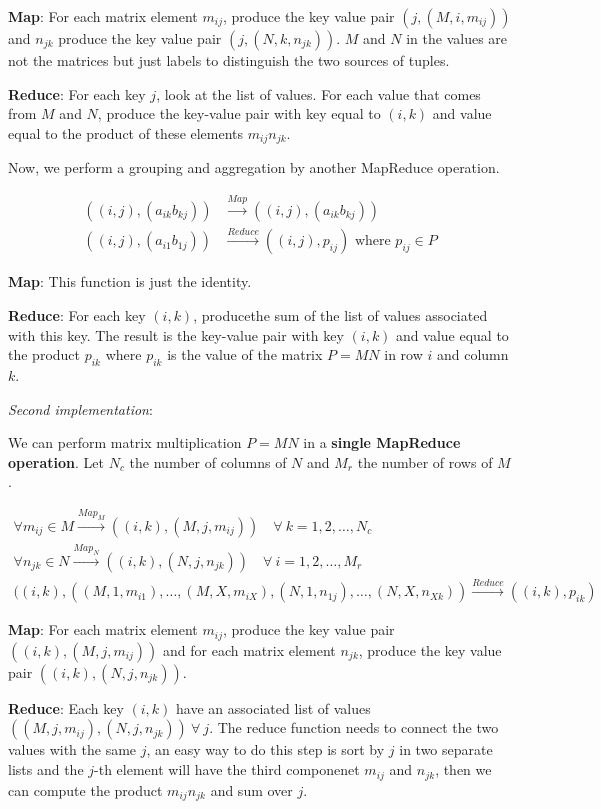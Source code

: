 \textbf{Map}: For each matrix element $m_{ij}$, produce the key value pair $(j, (M, i, m_{ij}))$ and $n_{jk}$ produce the key value pair $(j, (N, k, n_{jk}))$. $M$ and $N$ in the values are not the matrices but just labels to distinguish the two sources of tuples. 

\textbf{Reduce}: For each key $j$, look at the list of values. For each value that comes from $M$ and $N$, produce the key-value pair with key equal to $(i, k)$ and value equal to the product of these elements $m_{ij}n_{jk}$. 

Now, we perform a grouping and aggregation by another MapReduce operation.

\begin{equation*}
    \begin{split}
        ((i,j), (a_{ik} b_{kj})) & \xrightarrow{Map} ((i,j), (a_{ik} b_{kj}))\\
        ((i,j), (a_{i1} b_{1j})) & \xrightarrow{Reduce} ((i,j), p_{ij}) \text{ where } p_{ij} \in P  
    \end{split}
\end{equation*}

\textbf{Map}: This function is just the identity.  

\textbf{Reduce}: For each key $(i, k)$, producethe sum of the list of values associated with this key. The result is the key-value pair with key $(i, k)$ and value equal to the product $p_{ik}$ where $p_{ik}$ is the value of the matrix $P = MN$ in row $i$ and column $k$.

\textit{Second implementation}:

We can perform matrix multiplication $P = MN$ in a \textbf{single MapReduce operation}. Let $N_c$ the number of columns of $N$ and $M_r$ the number of rows of $M$. 

\begin{equation*}
    \begin{split}
        \forall m_{ij} \in M \xrightarrow{Map_M} ((i,k), (M,j,m_{ij})) \quad \forall \ k = 1, 2, \dots, N_c \\
        \forall n_{jk} \in N \xrightarrow{Map_N} ((i,k), (N,j,n_{jk})) \quad \forall \ i = 1, 2, \dots, M_r \\ 
        ((i,k), ((M, 1, m_{i1}),\dots, (M, X, m_{iX}), (N, 1, n_{1j}), \dots, (N, X, n_{Xk})) \xrightarrow{Reduce} ((i,k), p_{ik})
    \end{split}
\end{equation*}

\textbf{Map}: For each matrix element $m_{ij}$, produce the key value pair $((i, k), (M, j, m_{ij}))$ and for each matrix element $n_{jk}$, produce the key value pair $((i, k), (N, j, n_{jk}))$.

\textbf{Reduce}: Each key $(i, k)$ have an associated list of values $((M, j, m_{ij}), (N, j, n_{jk})) \ \forall \ j$. The reduce function needs to connect the two values with the same $j$, an easy way to do this step is sort by $j$ in two separate lists and the $j$-th element will have the third componenet $m_{ij}$ and $n_{jk}$, then we can compute the product $m_{ij}n_{jk}$ and sum over $j$.
